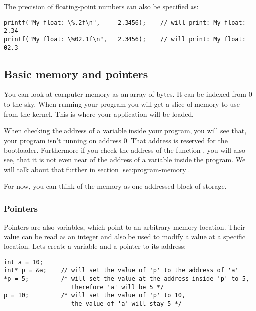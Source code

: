 The precision of floating-point numbers can also be specified as:
\begin{lstlisting}[style=CStyle,caption={printf float formatting}]
printf("My float: \%.2f\n",     2.3456);    // will print: My float: 2.34
printf("My float: \%02.1f\n",   2.3456);    // will print: My float: 02.3

\end{lstlisting}


\subsection{Basic memory and pointers}
You can look at computer memory as an array of bytes. It can be indexed from 0 to the sky.
When running your program you will get a slice of memory to use from the kernel.
This is where your application will be loaded.

When checking the address of a variable inside your program, you will see that, your program isn't running on address 0.
That address is reserved for the bootloader.
Furthermore if you check the address of the function , you will also see, that it is not even near of the address of a
variable inside the program. We will talk about that further in section \ref{sec:program-memory}.

For now, you can think of the memory as one addressed block of storage.

\subsubsection{Pointers}
Pointers are also variables, which point to an arbitrary memory location.
Their value can be read as an integer and also be used to modify a value at a specific location.
Lets create a variable and a pointer to its address:
\begin{lstlisting}[style=CStyle,caption={Pointers}]
int a = 10;
int* p = &a;    // will set the value of 'p' to the address of 'a'
*p = 5;         /* will set the value at the address inside 'p' to 5,
                   therefore 'a' will be 5 */
p = 10;         /* will set the value of 'p' to 10,
                   the value of 'a' will stay 5 */

\end{lstlisting}

